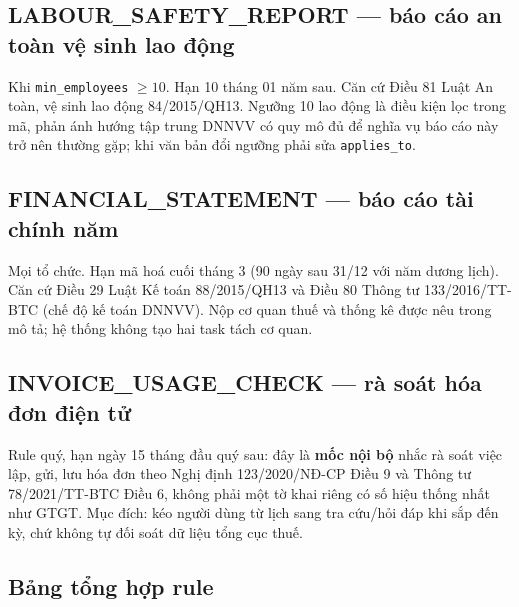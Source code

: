 \subsection{LABOUR\_SAFETY\_REPORT --- báo cáo an toàn vệ sinh lao động}

Khi \texttt{min\_employees} $\ge 10$. Hạn 10 tháng 01 năm sau. Căn cứ Điều 81
Luật An toàn, vệ sinh lao động 84/2015/QH13. Ngưỡng 10 lao động là điều kiện
lọc trong mã, phản ánh hướng tập trung DNNVV có quy mô đủ để nghĩa vụ báo cáo
này trở nên thường gặp; khi văn bản đổi ngưỡng phải sửa \texttt{applies\_to}.

\subsection{FINANCIAL\_STATEMENT --- báo cáo tài chính năm}

Mọi tổ chức. Hạn mã hoá cuối tháng 3 (90 ngày sau 31/12 với năm dương lịch).
Căn cứ Điều 29 Luật Kế toán 88/2015/QH13 và Điều 80 Thông tư 133/2016/TT-BTC
(chế độ kế toán DNNVV). Nộp cơ quan thuế và thống kê được nêu trong mô tả;
hệ thống không tạo hai task tách cơ quan.

\subsection{INVOICE\_USAGE\_CHECK --- rà soát hóa đơn điện tử}

Rule quý, hạn ngày 15 tháng đầu quý sau: đây là \textbf{mốc nội bộ} nhắc rà
soát việc lập, gửi, lưu hóa đơn theo Nghị định 123/2020/NĐ-CP Điều 9 và Thông
tư 78/2021/TT-BTC Điều 6, không phải một tờ khai riêng có số hiệu thống nhất
như GTGT. Mục đích: kéo người dùng từ lịch sang tra cứu/hỏi đáp khi sắp đến
kỳ, chứ không tự đối soát dữ liệu tổng cục thuế.

\subsection{Bảng tổng hợp rule}


